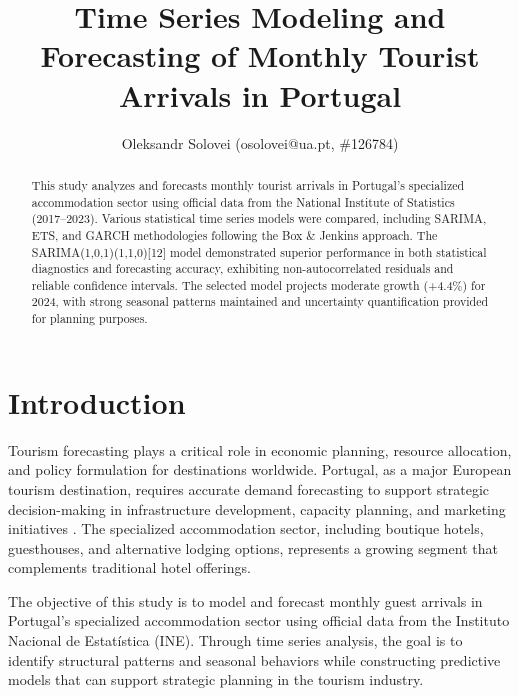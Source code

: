 \documentclass[journal]{IEEEtran}
\begin{document}
\title{Time Series Modeling and Forecasting of Monthly Tourist Arrivals in Portugal}

\author{Oleksandr Solovei (osolovei@ua.pt, \#126784)}


\maketitle

\begin{abstract}
This study analyzes and forecasts monthly tourist arrivals in Portugal's specialized accommodation sector using official data from the National Institute of Statistics (2017–2023). Various statistical time series models were compared, including SARIMA, ETS, and GARCH methodologies following the Box \& Jenkins approach. The SARIMA(1,0,1)(1,1,0)[12] model demonstrated superior performance in both statistical diagnostics and forecasting accuracy, exhibiting non-autocorrelated residuals and reliable confidence intervals. The selected model projects moderate growth (+4.4\%) for 2024, with strong seasonal patterns maintained and uncertainty quantification provided for planning purposes.
\end{abstract}

\IEEEpeerreviewmaketitle

\section{Introduction}

Tourism forecasting plays a critical role in economic planning, resource allocation, and policy formulation for destinations worldwide. Portugal, as a major European tourism destination, requires accurate demand forecasting to support strategic decision-making in infrastructure development, capacity planning, and marketing initiatives \cite{hyndman2021forecasting}. The specialized accommodation sector, including boutique hotels, guesthouses, and alternative lodging options, represents a growing segment that complements traditional hotel offerings.

The objective of this study is to model and forecast monthly guest arrivals in Portugal's specialized accommodation sector using official data from the Instituto Nacional de Estatística (INE). Through time series analysis, the goal is to identify structural patterns and seasonal behaviors while constructing predictive models that can support strategic planning in the tourism industry.
\end{document}
